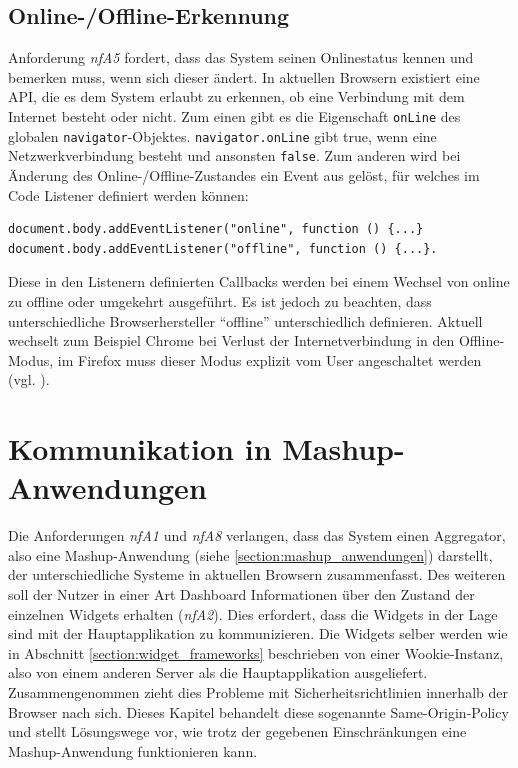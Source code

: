 \subsection{Online-/Offline-Erkennung}\label{section:online_offline_erkennung}
Anforderung \emph{nfA5} fordert, dass das System seinen Onlinestatus kennen und bemerken muss, wenn sich dieser ändert. In aktuellen Browsern existiert eine API, die es dem System erlaubt zu erkennen, ob eine Verbindung mit dem Internet besteht oder nicht. Zum einen gibt es die Eigenschaft \texttt{onLine} des globalen \texttt{navigator}-Objektes. \texttt{navigator.onLine} gibt true, wenn eine Netzwerkverbindung besteht und ansonsten \texttt{false}. Zum anderen wird bei Änderung des Online-/Offline-Zustandes ein Event aus gelöst, für welches im Code Listener definiert werden können:
\begin{lstlisting}
document.body.addEventListener("online", function () {...} 
document.body.addEventListener("offline", function () {...}.
\end{lstlisting}          
Diese in den Listenern definierten Callbacks werden bei einem Wechsel von online zu offline oder umgekehrt ausgeführt. Es ist jedoch zu beachten, dass unterschiedliche Browserhersteller "`offline"' unterschiedlich definieren. Aktuell wechselt zum Beispiel Chrome bei Verlust der Internetverbindung in den Offline-Modus, im Firefox muss dieser Modus explizit vom User angeschaltet werden (vgl. \cite{MozBug2011}).

\section{Kommunikation in Mashup-Anwendungen}
Die Anforderungen \emph{nfA1} und \emph{nfA8} verlangen, dass das System einen Aggregator, also eine Mashup-Anwendung (siehe \ref{section:mashup_anwendungen}) darstellt, der unterschiedliche Systeme in aktuellen Browsern zusammenfasst. Des weiteren soll der Nutzer in einer Art Dashboard Informationen über den Zustand der einzelnen Widgets erhalten (\emph{nfA2}). Dies erfordert, dass die Widgets in der Lage sind mit der Hauptapplikation zu kommunizieren. Die Widgets selber werden wie in Abschnitt \ref{section:widget_frameworks} beschrieben von einer Wookie-Instanz, also von einem anderen Server als die Hauptapplikation ausgeliefert. Zusammengenommen zieht dies Probleme mit Sicherheitsrichtlinien innerhalb der Browser nach sich. Dieses Kapitel behandelt diese sogenannte Same-Origin-Policy und stellt Lösungswege vor, wie trotz der gegebenen Einschränkungen eine Mashup-Anwendung funktionieren kann.

